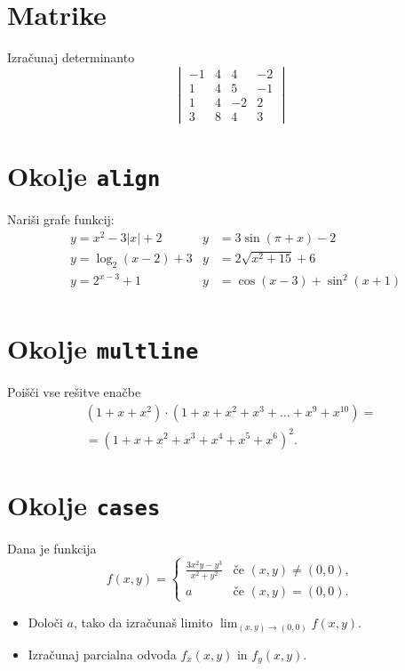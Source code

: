 \documentclass[a4paper,12pt]{article}
\begin{document}
\section*{Matrike}
Izračunaj determinanto
\[
\begin{vmatrix}
    -1 & 4 & 4 & -2 \\
    1 & 4 & 5 & -1 \\
    1 & 4 & -2 & 2 \\
    3 & 8 & 4 & 3
\end{vmatrix}
\]


\section*{Okolje \texttt{align}}
Nariši grafe funkcij:
\begin{align*}
&y = x^2 - 3|x| + 2    &y &= 3 \sin(\pi+x) - 2 \\
&y = \log_2(x-2) + 3   &y &= 2 \sqrt{x^2+15} + 6 \\
&y = 2^{x-3} + 1       &y &= \cos(x-3) + \sin^2(x+1) \\
\end{align*}

\section*{Okolje \texttt{multline}}
Poišči vse rešitve enačbe
\begin{multline*}
(1+x+x^2) \cdot (1+x+x^2+x^3+\ldots+x^9+x^{10}) = \\
=(1+x+x^2+x^3+x^4+x^5+x^6)^2.
\end{multline*}

\section*{Okolje \texttt{cases}}
Dana je funkcija
\[ 
f(x,y) =
\begin{cases}
   \frac{3x^2y-y^3}{x^2+y^2} & \text{če } (x,y) \neq (0,0), \\
   a & \text{če } (x,y) = (0,0).
\end{cases}
\]
\begin{itemize}
\item Določi \(a\), tako da izračunaš limito \( \lim_{(x,y)\to(0,0)} f(x,y) \).
\item Izračunaj parcialna odvoda \(f_x(x,y)\) in \(f_y(x,y)\).
\end{itemize}
\end{document}
